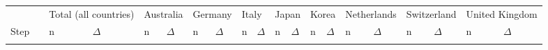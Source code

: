 \begin{tabular}{l>{\raggedright\arraybackslash}p{2.5in}llllllllllllllllll}
   \toprule 
 
&  & 
\multicolumn{2}{l}{Total (all countries)} &
\multicolumn{2}{l}{Australia} &
\multicolumn{2}{l}{Germany} &
\multicolumn{2}{l}{Italy} &
\multicolumn{2}{l}{Japan} &
\multicolumn{2}{l}{Korea} &
\multicolumn{2}{l}{Netherlands} &
\multicolumn{2}{l}{Switzerland} &
\multicolumn{2}{l}{United Kingdom}
\\  
 
 
\multicolumn{1}{l}{Step} & 
\multicolumn{1}{l}{Description} 
& n & $\Delta$
& n & $\Delta$
& n & $\Delta$
& n & $\Delta$
& n & $\Delta$
& n & $\Delta$
& n & $\Delta$
& n & $\Delta$
& n & $\Delta$
\\ 
\cmidrule(lr){1-2}
\cmidrule(lr){3-4}
\cmidrule(lr){5-6}
\cmidrule(lr){7-8}
\cmidrule(lr){9-10}
\cmidrule(lr){11-12}
\cmidrule(lr){13-14}
\cmidrule(lr){15-16}
\cmidrule(lr){17-18}
\cmidrule(lr){19-20}
\\[-1.8ex]  
 

\end{tabular}
